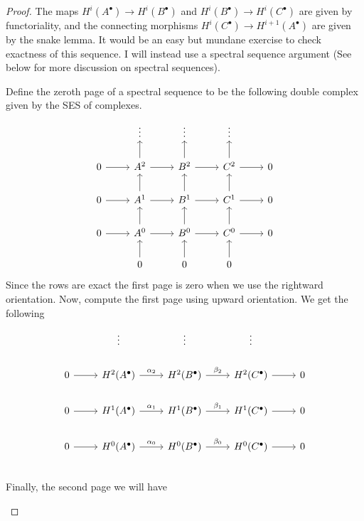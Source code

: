 \begin{proof}
  The maps $H^{i}(A^{\bullet})\to H^{i}(B^{\bullet})$ and $H^{i}(B^{\bullet})
  \to H^{i}(C^{\bullet})$ are given by functoriality, and the connecting
  morphisms $H^{i}(C^{\bullet})\to H^{i+1}(A^{\bullet})$ are given by the
  snake lemma. It would be an easy but mundane exercise to check exactness
  of this sequence. I will instead use a spectral sequence argument (See
  below for more discussion on spectral sequences).

  Define the zeroth page of a spectral sequence to be the following
  double complex given by the SES of complexes.
  \[\begin{tikzcd}
      & \vdots & \vdots & \vdots & \\
      0\rar & A^{2}\rar\uar & B^{2}\rar\uar & C^{2}\rar\uar & 0 \\
      0\rar & A^{1}\rar\uar & B^{1}\rar\uar & C^{1}\rar\uar & 0 \\
      0\rar & A^{0}\rar\uar & B^{0}\rar\uar & C^{0}\rar\uar & 0 \\
      & 0\uar & 0\uar & 0\uar &
    \end{tikzcd}\]
  Since the rows are exact the first page is zero when we use the rightward
  orientation. Now, compute the first page using upward orientation.
  We get the following
  \[\begin{tikzcd}
      & \vdots & \vdots & \vdots & \\
      0\rar & H^{2}(A^{\bullet})\rar{\alpha_{2}}
      & H^{2}(B^{\bullet})\rar{\beta_{2}} & H^{2}(C^{\bullet})\rar & 0 \\
      0\rar & H^{1}(A^{\bullet})\rar{\alpha_{1}}
      & H^{1}(B^{\bullet})\rar{\beta_{1}} & H^{1}(C^{\bullet})\rar & 0 \\
      0\rar & H^{0}(A^{\bullet})\rar{\alpha_{0}}
      & H^{0}(B^{\bullet})\rar{\beta_{0}} & H^{0}(C^{\bullet})\rar & 0 \\
    \end{tikzcd}\]
  Finally, the second page we will have

  \begin{center}
\end{center}
\end{proof}
